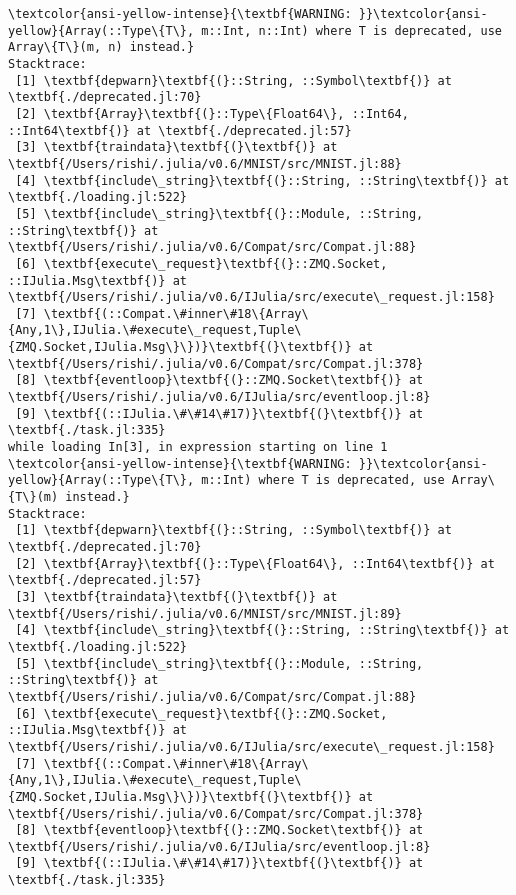 \documentclass[11pt]{article}
\begin{document}
    \begin{Verbatim}[commandchars=\\\{\}]
\textcolor{ansi-yellow-intense}{\textbf{WARNING: }}\textcolor{ansi-yellow}{Array(::Type\{T\}, m::Int, n::Int) where T is deprecated, use Array\{T\}(m, n) instead.}
Stacktrace:
 [1] \textbf{depwarn}\textbf{(}::String, ::Symbol\textbf{)} at \textbf{./deprecated.jl:70}
 [2] \textbf{Array}\textbf{(}::Type\{Float64\}, ::Int64, ::Int64\textbf{)} at \textbf{./deprecated.jl:57}
 [3] \textbf{traindata}\textbf{(}\textbf{)} at \textbf{/Users/rishi/.julia/v0.6/MNIST/src/MNIST.jl:88}
 [4] \textbf{include\_string}\textbf{(}::String, ::String\textbf{)} at \textbf{./loading.jl:522}
 [5] \textbf{include\_string}\textbf{(}::Module, ::String, ::String\textbf{)} at \textbf{/Users/rishi/.julia/v0.6/Compat/src/Compat.jl:88}
 [6] \textbf{execute\_request}\textbf{(}::ZMQ.Socket, ::IJulia.Msg\textbf{)} at \textbf{/Users/rishi/.julia/v0.6/IJulia/src/execute\_request.jl:158}
 [7] \textbf{(::Compat.\#inner\#18\{Array\{Any,1\},IJulia.\#execute\_request,Tuple\{ZMQ.Socket,IJulia.Msg\}\})}\textbf{(}\textbf{)} at \textbf{/Users/rishi/.julia/v0.6/Compat/src/Compat.jl:378}
 [8] \textbf{eventloop}\textbf{(}::ZMQ.Socket\textbf{)} at \textbf{/Users/rishi/.julia/v0.6/IJulia/src/eventloop.jl:8}
 [9] \textbf{(::IJulia.\#\#14\#17)}\textbf{(}\textbf{)} at \textbf{./task.jl:335}
while loading In[3], in expression starting on line 1
\textcolor{ansi-yellow-intense}{\textbf{WARNING: }}\textcolor{ansi-yellow}{Array(::Type\{T\}, m::Int) where T is deprecated, use Array\{T\}(m) instead.}
Stacktrace:
 [1] \textbf{depwarn}\textbf{(}::String, ::Symbol\textbf{)} at \textbf{./deprecated.jl:70}
 [2] \textbf{Array}\textbf{(}::Type\{Float64\}, ::Int64\textbf{)} at \textbf{./deprecated.jl:57}
 [3] \textbf{traindata}\textbf{(}\textbf{)} at \textbf{/Users/rishi/.julia/v0.6/MNIST/src/MNIST.jl:89}
 [4] \textbf{include\_string}\textbf{(}::String, ::String\textbf{)} at \textbf{./loading.jl:522}
 [5] \textbf{include\_string}\textbf{(}::Module, ::String, ::String\textbf{)} at \textbf{/Users/rishi/.julia/v0.6/Compat/src/Compat.jl:88}
 [6] \textbf{execute\_request}\textbf{(}::ZMQ.Socket, ::IJulia.Msg\textbf{)} at \textbf{/Users/rishi/.julia/v0.6/IJulia/src/execute\_request.jl:158}
 [7] \textbf{(::Compat.\#inner\#18\{Array\{Any,1\},IJulia.\#execute\_request,Tuple\{ZMQ.Socket,IJulia.Msg\}\})}\textbf{(}\textbf{)} at \textbf{/Users/rishi/.julia/v0.6/Compat/src/Compat.jl:378}
 [8] \textbf{eventloop}\textbf{(}::ZMQ.Socket\textbf{)} at \textbf{/Users/rishi/.julia/v0.6/IJulia/src/eventloop.jl:8}
 [9] \textbf{(::IJulia.\#\#14\#17)}\textbf{(}\textbf{)} at \textbf{./task.jl:335}

\end{Verbatim}
\end{document}
